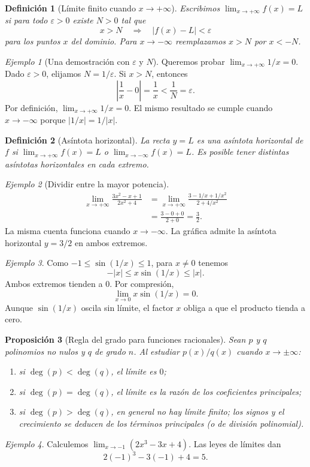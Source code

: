 \documentclass[12pt]{article}
\newtheorem{definicion}{Definición}[section]
\newtheorem{proposicion}[definicion]{Proposición}
\theoremstyle{remark}
\newtheorem{ejemplo}{Ejemplo}
\begin{document}
\begin{definicion}[Límite finito cuando $x\to+\infty$]
Escribimos $\lim_{x\to+\infty}f(x)=L$ si para todo $\varepsilon>0$ existe $N>0$ tal que
\[
 x>N\quad\Longrightarrow\quad|f(x)-L|<\varepsilon
\]
para los puntos $x$ del dominio. Para $x\to-\infty$ reemplazamos $x>N$ por $x<-N$.
\end{definicion}

\begin{ejemplo}[Una demostración con $\varepsilon$ y $N$]
Queremos probar $\lim_{x\to+\infty}1/x=0$. Dado $\varepsilon>0$, elijamos $N=1/\varepsilon$. Si $x>N$, entonces
\[
 \left|\frac1x-0\right|=\frac1x<\frac1N=\varepsilon.
\]
Por definición, $\boxed{\lim_{x\to+\infty}1/x=0}$. El mismo resultado se cumple cuando $x\to-\infty$ porque $|1/x|=1/|x|$.
\end{ejemplo}

\begin{definicion}[Asíntota horizontal]
La recta $y=L$ es una asíntota horizontal de $f$ si $\lim_{x\to+\infty}f(x)=L$ o $\lim_{x\to-\infty}f(x)=L$. Es posible tener distintas asíntotas horizontales en cada extremo.
\end{definicion}

\begin{ejemplo}[Dividir entre la mayor potencia]
\begin{align*}
\lim_{x\to+\infty}\frac{3x^2-x+1}{2x^2+4}
 &=\lim_{x\to+\infty}\frac{3-1/x+1/x^2}{2+4/x^2}\\
 &=\frac{3-0+0}{2+0}=\boxed{\frac32}.
\end{align*}
La misma cuenta funciona cuando $x\to-\infty$. La gráfica admite la asíntota horizontal $y=3/2$ en ambos extremos.
\end{ejemplo}

\begin{ejemplo}
Como $-1\le\sin(1/x)\le1$, para $x\ne0$ tenemos
\[
-|x|\le x\sin(1/x)\le|x|.
\]
Ambos extremos tienden a $0$. Por compresión,
\[
\boxed{\lim_{x\to0}x\sin(1/x)=0.}
\]
Aunque $\sin(1/x)$ oscila sin límite, el factor $x$ obliga a que el producto tienda a cero.
\end{ejemplo}

\begin{proposicion}[Regla del grado para funciones racionales]
Sean $p$ y $q$ polinomios no nulos y $q$ de grado $n$. Al estudiar $p(x)/q(x)$ cuando $x\to\pm\infty$:
\begin{enumerate}[label=\roman*)]
\item si $\deg(p)<\deg(q)$, el límite es $0$;
\item si $\deg(p)=\deg(q)$, el límite es la razón de los coeficientes principales;
\item si $\deg(p)>\deg(q)$, en general no hay límite finito; los signos y el crecimiento se deducen de los términos principales (o de división polinomial).
\end{enumerate}
\end{proposicion}
\begin{ejemplo}
Calculemos $\lim_{x\to-1}(2x^3-3x+4)$. Las leyes de límites dan
\[
2(-1)^3-3(-1)+4=\boxed{5}.
\]
\end{ejemplo}
\end{document}
